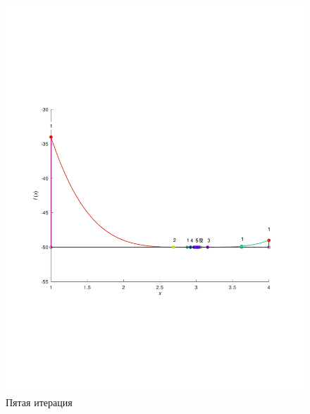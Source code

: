 \documentclass[a4paper,12pt]{article}
\begin{document}
    \begin{figure}[H]
        \centering
        \includegraphics[scale=0.4]{5Bolcanoitter.pdf}
        \caption{Пятая итерация}
    \end{figure}     
\newpage
\\
\end{document}
